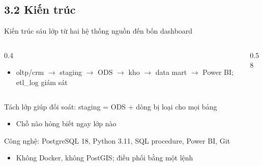 \subsection{3.2 Kiến trúc}

\begin{frame}{Kiến trúc sáu lớp từ hai hệ thống nguồn đến bốn dashboard}
\begin{columns}[T]\begin{column}{0.4\textwidth}
\begin{itemize}
  \item oltp/crm $\rightarrow$ staging $\rightarrow$ ODS $\rightarrow$ kho $\rightarrow$ data mart $\rightarrow$ Power BI; etl\_log giám sát
\end{itemize}
\end{column}\begin{column}{0.58\textwidth}
\begin{center}\end{center}
\end{column}\end{columns}

\end{frame}

\begin{frame}{Tách lớp giúp đối soát: staging = ODS + dòng bị loại cho mọi bảng}
\begin{itemize}
  \item Chỗ nào hỏng biết ngay lớp nào
\end{itemize}

\end{frame}

\begin{frame}{Công nghệ: PostgreSQL 18, Python 3.11, SQL procedure, Power BI, Git}
\begin{itemize}
  \item Không Docker, không PostGIS; điều phối bằng một lệnh
\end{itemize}

\end{frame}


